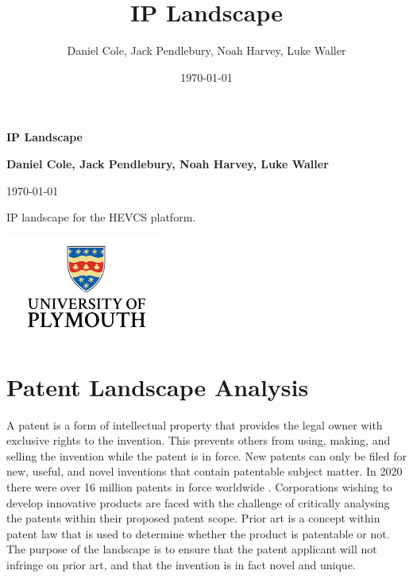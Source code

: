 \documentclass [12pt]{article}
\begin{document}
\title{\bf IP Landscape}
\author{Daniel Cole, Jack Pendlebury, Noah Harvey, Luke Waller}
\date{\today}

\begin{titlepage}
    \begin{center}
        \vspace*{1cm}

        {\Huge \textbf{IP Landscape}}

        \vspace{1.5cm}

        \textbf{Daniel Cole, Jack Pendlebury, Noah Harvey, Luke Waller}

        \today

        \vfill

        IP landscape for the HEVCS platform.

        \vspace{0.8cm}

        \includegraphics[width=0.4\textwidth]{UOP_Logo.png}

    \end{center}
\end{titlepage}

\newpage
{}
\setcounter{page}{1}
\tableofcontents
\newpage

\listoffigures
\listoftables



\newpage
\section{Patent Landscape Analysis}\label{sec:PLA}

A patent is a form of intellectual property that provides the legal owner with exclusive rights to the invention.
This prevents others from using, making, and selling the invention while the patent is in force.
New patents can only be filed for new, useful, and novel inventions that contain patentable subject matter.
In 2020 there were over 16 million patents in force worldwide \cite{WIPO_ref}.
Corporations wishing to develop innovative products are faced with the challenge of critically analysing the patents within their proposed patent scope.
Prior art is a concept within patent law that is used to determine whether the product is patentable or not.
The purpose of the landscape is to ensure that the patent applicant will not infringe on prior art, and that the invention is in fact novel and unique.
\end{document}

